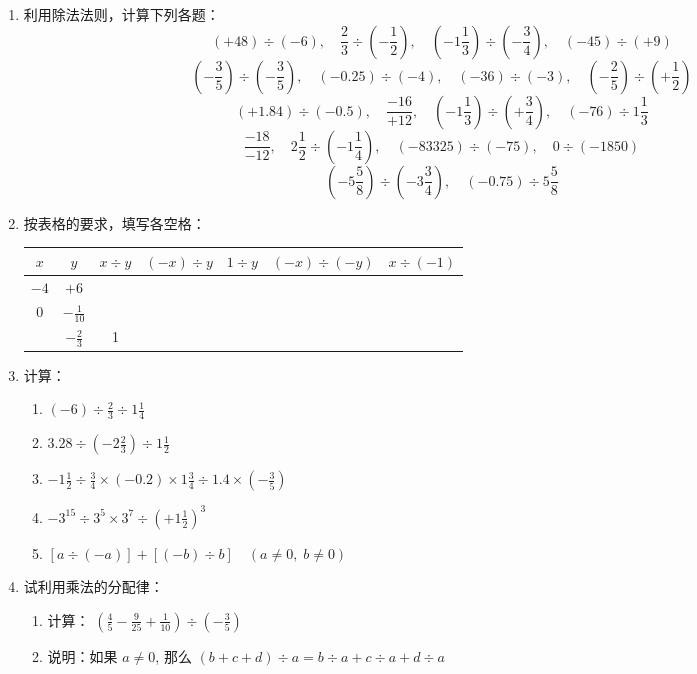 \begin{enumerate}
\item 利用除法法则，计算下列各题：
\[(+48)\div (-6),\quad \frac{2}{3}\div \left(-\frac{1}{2}\right),\quad \left(-1 \frac{1}{3}\right)\div\left(-\frac{3}{4}\right), \quad (-45)\div (+9)\]
\[\left(-\frac{3}{5}\right) \div\left(-\frac{3}{5}\right), \quad (-0.25) \div(-4), \quad 
(-36) \div(-3), \quad\left(-\frac{2}{5}\right) \div\left(+\frac{1}{2}\right)\]
\[(+1.84) \div(-0.5), \quad \frac{-16}{+12},\quad 
\left(-1 \frac{1}{3}\right)\div\left(+\frac{3}{4}\right), \quad(-76) \div 1 \frac{1}{3}\]
\[\frac{-18}{-12}, \quad 2 \frac{1}{2}\div \left(-1\frac{1}{4}\right),\quad (-83325) \div(-75), \quad 0 \div(-1850)\]
\[\left(-5 \frac{5}{8}\right)\div \left(-3 \frac{3}{4}\right), \quad(-0.75) \div 5 \frac{5}{8}\]

\item 按表格的要求，填写各空格：
\begin{center}
    \begin{tabular}{c|c|c|c|c|c|c}
    \hline
    $x$  &  $y$  &  $x\div y$  &  $(-x)\div y$  &     $1\div y$  &  $(-x)\div(-y)$ &$x\div(-1)$\\
    \hline
 $-4$ & $+6$  &&&&&\\
 $0$ & $-\frac{1}{10}$  &&&&&\\
  & $-\frac{2}{3}$  &1&&&&\\
    \hline
    \end{tabular}    
    \end{center}

\item 计算：
\begin{enumerate}
    \item $(-6) \div \frac{2}{3} \div 1 \frac{1}{4}$
    \item $3.28 \div\left(-2 \frac{2}{3}\right) \div 1 \frac{1}{2}$
    \item $-1 \frac{1}{2} \div \frac{3}{4} \times(-0.2) \times 1 \frac{3}{4} \div 1.4 \times\left(-\frac{3}{5}\right)$
    \item $-3^{15}\div 3^{5} \times 3^{7} \div\left(+1 \frac{1}{2}\right)^{3}$
    \item $[a\div (-a)]+[(-b)\div b] \quad (a \neq 0,\; b \neq 0)$
\end{enumerate}
\item 试利用乘法的分配律：
\begin{enumerate}
    \item 计算： $\left(\frac{4}{5}-\frac{9}{25}+\frac{1}{10}\right) \div\left(-\frac{3}{5}\right)$
    \item 说明：如果 $a \neq 0$, 那么 $(b+c+d)\div a=b \div a+c\div a+d\div a$
\end{enumerate}


\end{enumerate}
